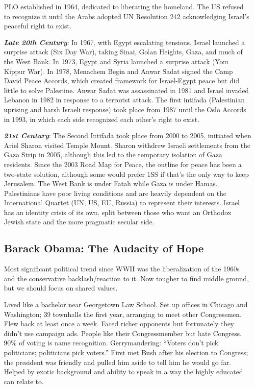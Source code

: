 \documentclass[
]{article}
\begin{document}
PLO established in 1964, dedicated to liberating the homeland. The US
refused to recognize it until the Arabs adopted UN Resolution 242
acknowledging Israel's peaceful right to exist.

\textbf{\emph{Late 20th Century}}: In 1967, with Egypt escalating
tensions, Israel launched a surprise attack (Six Day War), taking Sinai,
Golan Heights, Gaza, and much of the West Bank. In 1973, Egypt and Syria
launched a surprise attack (Yom Kippur War). In 1978, Menachem Begin and
Anwar Sadat signed the Camp David Peace Accords, which created framework
for Israel-Egypt peace but did little to solve Palestine. Anwar Sadat
was assassinated in 1981 and Israel invaded Lebanon in 1982 in response
to a terrorist attack. The first intifada (Palestinian uprising and
harsh Israeli response) took place from 1987 until the Oslo Accords in
1993, in which each side recognized each other's right to exist.

\textbf{\emph{21st Century}}: The Second Intifada took place from 2000
to 2005, initiated when Ariel Sharon visited Temple Mount. Sharon
withdrew Israeli settlements from the Gaza Strip in 2005, although this
led to the temporary isolation of Gaza residents. Since the 2003 Road
Map for Peace, the outline for peace has been a two-state solution,
although some would prefer 1SS if that's the only way to keep Jerusalem.
The West Bank is under Fatah while Gaza is under Hamas. Palestinians
have poor living conditions and are heavily dependent on the
International Quartet (UN, US, EU, Russia) to represent their interests.
Israel has an identity crisis of its own, split between those who want
an Orthodox Jewish state and the more pragmatic secular side.

\hypertarget{barack-obama-the-audacity-of-hope}{%
\subsection{Barack Obama: The Audacity of
Hope}\label{barack-obama-the-audacity-of-hope}}

Most significant political trend since WWII was the liberalization of
the 1960s and the conservative backlash/reaction to it. Now tougher to
find middle ground, but we should focus on shared values.

Lived like a bachelor near Georgetown Law School. Set up offices in
Chicago and Washington; 39 townhalls the first year, arranging to meet
other Congressmen. Flew back at least once a week. Faced richer
opponents but fortunately they didn't use campaign ads. People like
their Congressmember but hate Congress. 90\% of voting is name
recognition. Gerrymandering: ``Voters don't pick politicians;
politicians pick voters.'' First met Bush after his election to
Congress; the president was friendly and pulled him aside to tell him he
would go far. Helped by exotic background and ability to speak in a way
the highly educated can relate to.
\end{document}
